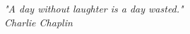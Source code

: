 \clearpage
\begin{flushright}
\mbox{}\vfill
{\sffamily\itshape
"A day without laughter is a day wasted."\\
Charlie Chaplin}
\end{flushright}
